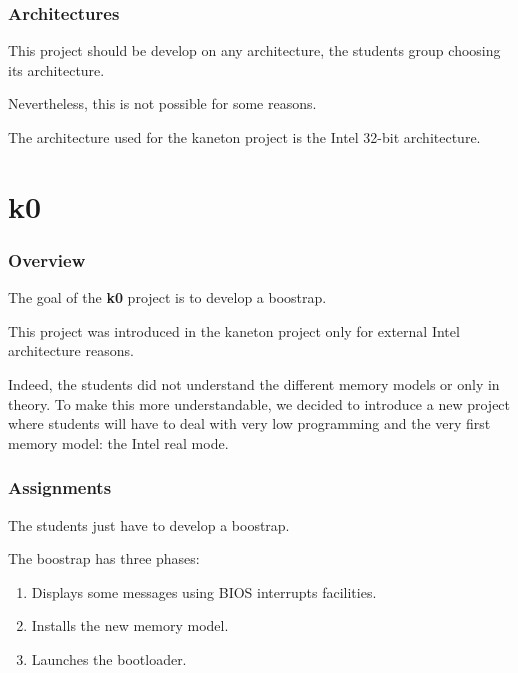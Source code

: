 
\begin{frame}
  \frametitle{Architectures}

  This project should be develop on any architecture, the students group
  choosing its architecture.

  \nl

  Nevertheless, this is not possible for some reasons.

  \nl

  The architecture used for the kaneton project is the Intel 32-bit
  architecture.
\end{frame}

%
%

\section{k0}


\begin{frame}
  \frametitle{Overview}

  The goal of the \textbf{k0} project is to develop a boostrap.

  \nl

  This project was introduced in the kaneton project only for
  external Intel architecture reasons.

  \nl

  Indeed, the students did not understand the different memory models
  or only in theory. To make this more understandable, we decided to
  introduce a new project where students will have to deal with very
  low programming and the very first memory model: the Intel real mode.
\end{frame}


\begin{frame}
  \frametitle{Assignments}

  The students just have to develop a boostrap.

  \nl

  The boostrap has three phases:

  \begin{enumerate}[<+->]
    \item
      Displays some messages using BIOS interrupts facilities.
    \item
      Installs the new memory model.
    \item
      Launches the bootloader.
  \end{enumerate}
\end{frame}

